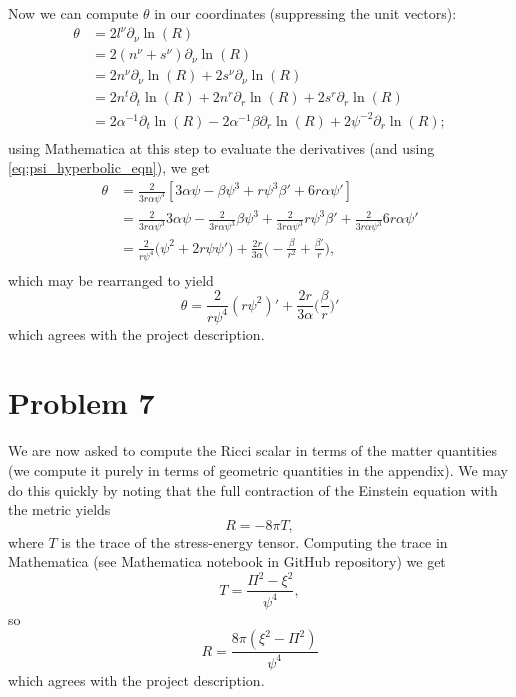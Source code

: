 \documentclass[12pt]{article}
\numberwithin{equation}{section}
\begin{document}
Now we can compute $\theta$ in our coordinates (suppressing the unit vectors):
\begin{equation}
\begin{aligned}
\theta &= 2 l^\nu \partial_\nu \ln(R) \\
&= 2 (n^\nu + s^\nu) \partial_\nu \ln(R) \\
&= 2 n^\nu \partial_\nu \ln(R) + 2 s^\nu \partial_\nu \ln(R) \\
&= 2 n^t \partial_t \ln(R) + 2 n^r \partial_r \ln(R) + 2 s^r \partial_r \ln(R) \\
&= 2 \alpha^{-1} \partial_t \ln(R) - 2 \alpha^{-1} \beta \partial_r \ln(R) + 2 \psi^{-2} \partial_r \ln(R); \\
\end{aligned}
\end{equation}
using Mathematica at this step to evaluate the derivatives (and using \ref{eq:psi_hyperbolic_eqn}), we get
\begin{equation}
\begin{aligned}
\theta &= \frac{2}{3 r \alpha \psi^3} [3 \alpha \psi - \beta \psi^3 + r \psi^3 \beta' + 6 r \alpha \psi'] \\
&= \frac{2}{3 r \alpha \psi^3} 3 \alpha \psi - \frac{2}{3 r \alpha \psi^3} \beta \psi^3 + \frac{2}{3 r \alpha \psi^3} r \psi^3 \beta' + \frac{2}{3 r \alpha \psi^3} 6 r \alpha \psi' \\
&= \frac{2}{r \psi^4} \Big( \psi^2 + 2 r \psi \psi' \Big) + \frac{2 r}{3 \alpha} \Big( - \frac{\beta}{r^2} + \frac{\beta'}{r} \Big), \\
\end{aligned}
\end{equation}
which may be rearranged to yield
\begin{equation}
\boxed{\theta = \frac{2}{r \psi^4} (r \psi^2)' + \frac{2 r}{3 \alpha} \Big( \frac{\beta}{r} \Big)' }
\end{equation}
which agrees with the project description.

\section{Problem 7}
We are now asked to compute the Ricci scalar in terms of the matter quantities (we compute it purely in terms of geometric quantities in the appendix).  We may do this quickly by noting that the full contraction of the Einstein equation with the metric yields
\begin{equation}
R = - 8 \pi T,
\end{equation}
where $T$ is the trace of the stress-energy tensor.  Computing the trace in Mathematica (see Mathematica notebook in GitHub repository) we get
\begin{equation}
T = \frac{\Pi^2 - \xi^2}{\psi^4},
\end{equation}
so
\begin{equation}
\boxed{ R = \frac{8 \pi (\xi^2 - \Pi^2)}{\psi^4} }
\end{equation}
which agrees with the project description.
\end{document}
